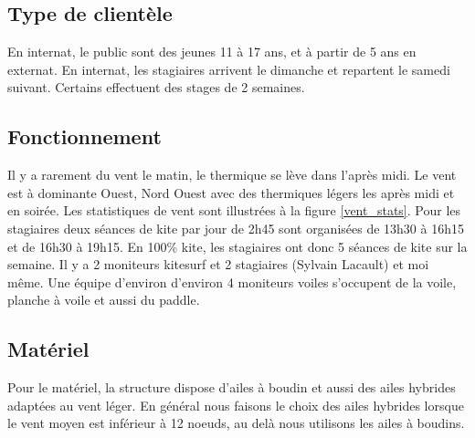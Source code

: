 \documentclass[11pt,a4paper]{report}
\begin{document}
\subsection{Type de clientèle}
En internat, le public sont des jeunes 11 à 17 ans, et  à partir de 5 ans  en externat.
En internat, les stagiaires arrivent le dimanche et repartent le samedi suivant.
Certains effectuent des stages de 2 semaines.
\subsection{Fonctionnement}
Il y a rarement du vent le matin, le thermique se lève dans l'après midi.
Le vent est à dominante Ouest, Nord Ouest avec des thermiques légers les après midi et 
en soirée. Les statistiques de vent sont illustrées à la figure \ref{vent_stats}.
Pour les stagiaires deux séances de kite par jour de 2h45 sont organisées de
13h30 à 16h15 et de 16h30 à 19h15. En 100\% kite, les stagiaires ont donc
5 séances de kite sur la semaine.
Il y a 2 moniteurs kitesurf et 2 stagiaires (Sylvain Lacault) et moi m\^eme.
Une équipe d'environ d'environ 4 moniteurs voiles s'occupent de la voile, 
planche à voile et aussi du paddle.

\subsection{Matériel}
Pour le matériel, la structure dispose d'ailes à boudin et aussi des ailes 
hybrides adaptées au vent léger. En général nous faisons le choix des ailes hybrides 
lorsque le vent moyen est inférieur à 12 noeuds, au delà nous utilisons
les ailes à boudins.
\end{document}
